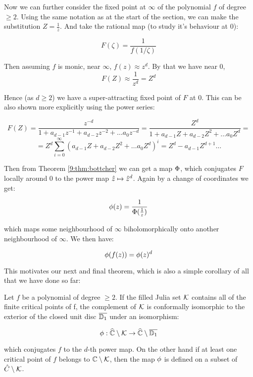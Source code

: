 \documentclass[../main.tex]{subfiles}
\begin{document}
Now we can further consider the fixed point at $\infty$ of the polynomial $f$ of degree $\geq 2$. Using the same notation as at the start of the section, we can make the substitution $Z = \frac{1}{z}$. And take the rational map (to study it's behaviour at 0):

$$F(\zeta) = \frac{1}{f(1/\zeta)}$$

Then assuming $f$ is monic, near $\infty$, $f(z) \approx z^d$. By that we have near 0, $$F(Z) \approx \frac{1}{z^d} = Z^d$$

Hence (as $d\geq 2$) we have a super-attracting fixed point of $F$ at 0. This can be also shown more explicitly using the power series:

$$F(Z) =\frac{z^{-d}}{1+a_{d-1}z^{-1} + a_{d-2}z^{-2}+\dots a_0z^{-d} } = \frac{Z^d}{1+a_{d-1}Z+a_{d-2}Z^2 +\dots a_0Z^d} =$$ 
$$= Z^d \sum_{i=0}^{\infty}\left(a_{d-1}Z+a_{d-2}Z^2 +\dots a_0Z^d\right)^i = Z^d - a_{d-1}Z^{d+1}\dots$$

Then from Theorem \ref{9:thm:bottcher} we can get a map $\Phi$, which conjugates $F$ locally around 0 to the power map $\hat{z} \mapsto \hat{z}^d$. Again by a change of coordinates we get:

$$\phi(z) = \frac{1}{\Phi(\frac{1}{z})}$$

which maps some neighbourhood of $\infty$ biholomorphically onto another neighbourhood of $\infty$. We then have:

$$\phi(f(z)) = \phi(z)^d$$

This motivates our next and final theorem, which is also a simple corollary of all that we have done so far:

\begin{cor}
Let $f$ be a polynomial of degree $\geq 2$. If the filled Julia set $\mathcal{K}$ contains all of the finite critical points of f, the complement of $\mathcal{K}$ is conformally isomorphic to the exterior of the closed unit disc $\overline{\mathbb{D}_1}$ under an isomorphism:

$$\phi: \widehat{\mathbb{C}}\setminus \mathcal{K} \to \widehat{\mathbb{C}} \setminus \overline{\mathbb{D}_1}$$

which conjugates $f$ to the $d$-th power map. On the other hand if at least one critical point of $f$ belongs to $\mathbb{C}\setminus \mathcal{K}$, then the map $\phi$ is defined on a subset of $\hat{C}\setminus \mathcal{K}$.

\end{cor}
\end{document}

